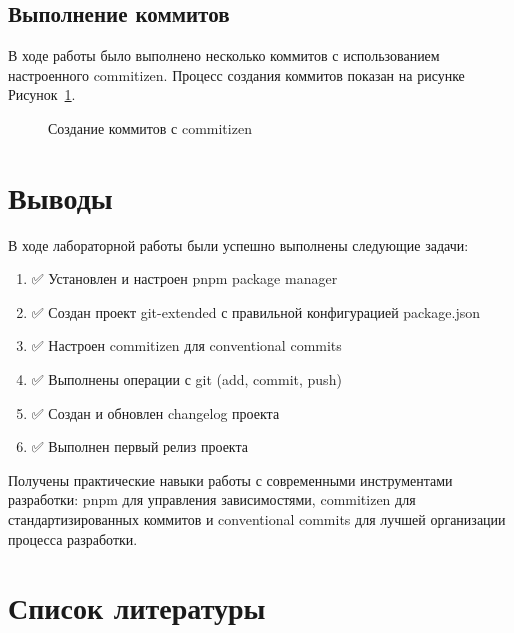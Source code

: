 \documentclass[
  12pt,
  a4paper,
  DIV=11,
  numbers=noendperiod]{scrreprt}
\providecommand{\tightlist}{%
  \setlength{\itemsep}{0pt}\setlength{\parskip}{0pt}}\usepackage{longtable,booktabs,array}
\begin{document}
\section{Выполнение
коммитов}\label{ux432ux44bux43fux43eux43bux43dux435ux43dux438ux435-ux43aux43eux43cux43cux438ux442ux43eux432}

В ходе работы было выполнено несколько коммитов с использованием
настроенного commitizen. Процесс создания коммитов показан на рисунке
Рисунок~\ref{fig-commits}.

\begin{figure}


\caption{\label{fig-commits}Создание коммитов с commitizen}

\end{figure}%

\chapter{Выводы}\label{ux432ux44bux432ux43eux434ux44b}

В ходе лабораторной работы были успешно выполнены следующие задачи:

\begin{enumerate}
\def\labelenumi{\arabic{enumi}.}
\tightlist
\item
  ✅ Установлен и настроен pnpm package manager
\item
  ✅ Создан проект git-extended с правильной конфигурацией package.json
\item
  ✅ Настроен commitizen для conventional commits
\item
  ✅ Выполнены операции с git (add, commit, push)
\item
  ✅ Создан и обновлен changelog проекта
\item
  ✅ Выполнен первый релиз проекта
\end{enumerate}

Получены практические навыки работы с современными инструментами
разработки: pnpm для управления зависимостями, commitizen для
стандартизированных коммитов и conventional commits для лучшей
организации процесса разработки.

\chapter*{Список
литературы}\label{ux441ux43fux438ux441ux43eux43a-ux43bux438ux442ux435ux440ux430ux442ux443ux440ux44b}

\printbibliography[heading=none]
\end{document}
